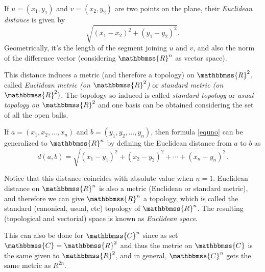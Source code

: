 \documentclass[12pt]{article}
\newcommand{\C}{\mathbbmss{C}}
\newcommand{\R}{\mathbbmss{R}}
\newcommand{\mathbb}[1]{\mathbbmss{#1}}
\begin{document}
If $u=(x_1,y_1)$ and $v=(x_2,y_2)$ are two points on the plane, their \emph{Euclidean distance} is given by 
\begin{equation}\label{equno}
\sqrt{(x_1-x_2)^2 + (y_1-y_2)^2}.
\end{equation}
Geometrically, it's the length of the segment joining $u$ and $v$, and also the norm of the difference vector (considering $\R^n$ as vector space).

This distance induces a metric (and therefore a topology) on $\mathbb{R}^2$, called \emph{Euclidean metric (on $\R^2$)} or \emph{standard metric (on $\mathbb{R}^2)$}. The topology so induced is called \emph{standard topology} or \emph{usual topology on $\R^2$} and one basis can be obtained considering the set of all the open balls.

If $a=(x_1,x_2,\ldots,x_n)$ and $b=(y_1,y_2,\ldots,y_n)$, then formula \ref{equno} can be generalized to $\R^n$ by defining the Euclidean distance from $a$ to $b$ as
\begin{equation}d(a,b)=\sqrt{(x_1-y_1)^2+(x_2-y_2)^2+\cdots+(x_n-y_n)^2}.\end{equation}

Notice that this distance coincides with absolute value when $n=1$.
Euclidean distance on $\mathbb{R}^n$ is also a metric (Euclidean or standard metric), and therefore we can give $\mathbb{R}^n$ a topology, which is called the standard (canonical, usual, etc) topology of $\mathbb{R}^n$. The resulting (topological and vectorial) space is known as \emph{Euclidean space}.

This can also be done for $\C^n$ since as set $\C=\R^2$ and thus the metric on $\C$ is the same given to $\R^2$, and in general, $\C^n$ gets the same metric as $R^{2n}$.
\end{document}
